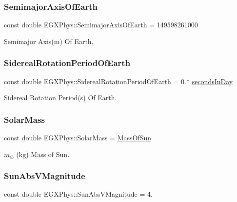 \subsubsection{\texorpdfstring{Semimajor\+Axis\+Of\+Earth}{SemimajorAxisOfEarth}}
{\footnotesize\ttfamily const double E\+G\+X\+Phys\+::\+Semimajor\+Axis\+Of\+Earth = 149598261000}

Semimajor Axis(m) Of Earth. \mbox{\label{namespace_e_g_x_phys_a34a388ac3f9196bb3cdbdbee5ff3cdb7}} 
\subsubsection{\texorpdfstring{Sidereal\+Rotation\+Period\+Of\+Earth}{SiderealRotationPeriodOfEarth}}
{\footnotesize\ttfamily const double E\+G\+X\+Phys\+::\+Sidereal\+Rotation\+Period\+Of\+Earth = 0.$\ast$ \hyperlink{namespace_e_g_x_phys_ab4f86327f64403b843077ecc189ce52b}{seconds\+In\+Day}}

Sidereal Rotation Period(s) Of Earth. \mbox{\label{namespace_e_g_x_phys_aa8636def23e66bc4ad32394a088b3950}} 
\subsubsection{\texorpdfstring{Solar\+Mass}{SolarMass}}
{\footnotesize\ttfamily const double E\+G\+X\+Phys\+::\+Solar\+Mass = \hyperlink{namespace_e_g_x_phys_a6e84ae13f1dbcecb215af787bbc12cd6}{Mass\+Of\+Sun}}

$m_\odot$ (kg) Mass of Sun. \mbox{\label{namespace_e_g_x_phys_a61266dc1aaacdd9a9bd0f2fa92aa21c9}} 
\subsubsection{\texorpdfstring{Sun\+Abs\+V\+Magnitude}{SunAbsVMagnitude}}
{\footnotesize\ttfamily const double E\+G\+X\+Phys\+::\+Sun\+Abs\+V\+Magnitude = 4.}

